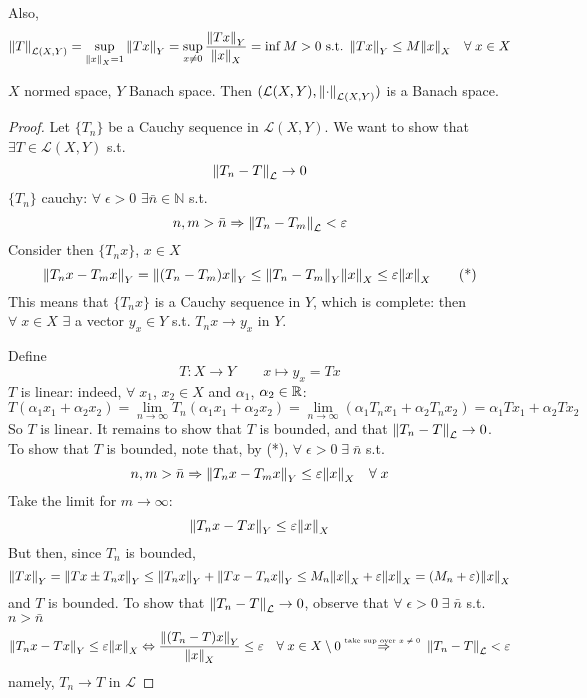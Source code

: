 Also, 
\[
    \norm{T}_{\mathcal{L}(X, Y)} = \sup_{\norm{x}_X = 1} \norm{Tx}_Y = \sup_{x \neq 0} \frac{\norm{Tx}_Y}{\norm{x}_X} = \inf{M >0 \text{ s.t. } \norm{Tx}_Y \leq M \norm{x}_X \quad \forall \; x \in X}
\]

\begin{theorem}
    \(X\) normed space, \(Y\) Banach space. Then \((\mathcal{L}(X, Y), \norm{\cdot}_{\mathcal{L}(X, Y)})\) is a Banach space.
\end{theorem}
\begin{proof}
    Let \(\{T_n\}\) be a Cauchy sequence in \(\mathcal{L}(X, Y)\). We want to show that \(\exists T \in \mathcal{L}(X, Y) \) s.t.
    \[
        \norm{T_n - T}_\mathcal{L} \to 0
    \]
    \(\{T_n\}\) cauchy: \(\forall \; \epsilon >0 \) \(\exists \bar{n} \in \mathbb{N}\) s.t. 
    \[
        n, m > \bar{n} \Rightarrow \norm{T_n - T_m }_\mathcal{L} < \varepsilon
    \]
    Consider then \(\{ T_n x \}\), \(x \in X\)
    \[
        \norm{T_n x - T_m x }_Y = \norm{(T_n - T_m)x}_Y \leq \norm{T_n - T_m}_Y \norm{x}_X \leq \varepsilon \norm{x}_X \tag{*}
    \]
    This means that \(\{ T_n x \}\) is a Cauchy sequence in \(Y\), which is complete: then \(\forall \; x \in X\) \(\exists \) a vector \(y_x \in Y\) s.t. \(T_n x \to y_x\) in \(Y\).

    Define 
    \[
        T: X \to Y \qquad x \mapsto y_x = Tx
    \]
    \(T\) is linear: indeed, \(\forall \; x_1\), \(x_2 \in X\) and \(\alpha_1\), \(\alpha_2 \in \mathbb{R}\):
    \[
        T(\alpha_1 x_1 + \alpha_2 x_2) = \lim_{n \to \infty} T_n (\alpha_1 x_1 + \alpha_2 x_2) = \lim_{n \to \infty} (\alpha_1 T_n x_1 + \alpha_2 T_n x_2) = \alpha_1 Tx_1 + \alpha_2 Tx_2
    \]
    So \(T \) is linear. It remains to show that \(T\) is bounded, and that \(\norm{T_n - T}_{\mathcal{L}} \to 0\).
    To show that \(T\) is bounded, note that, by (*), \(\forall \; \epsilon >0 \; \exists \; \bar{n}\) s.t.
    \[
        n, m > \bar{n} \Rightarrow \norm{T_n x - T_m x}_Y \leq \varepsilon \norm{x}_X \quad \forall \; x 
    \]
    Take the limit for \(m \to \infty\): 
    \[
        \norm{T_n x - Tx}_Y \leq \varepsilon \norm{x}_X
    \]
    But then, since \(T_n\) is bounded, 
    \[
        \norm{Tx}_Y = \norm{Tx \pm T_n x}_Y \leq \norm{T_n x}_Y + \norm{Tx - T_n x}_Y \leq M_n \norm{x}_X + \varepsilon \norm{x}_X = (M_n + \varepsilon) \norm{x}_X
    \]
    and \(T\) is bounded. To show that \(\norm{T_n - T}_\mathcal{L} \to 0\), observe that \(\forall \; \epsilon >0 \; \exists \; \bar{n} \) s.t. \(n > \bar{n}\)
    \[
        \norm{T_n x - Tx}_Y \leq \varepsilon \norm{x}_X 
        \Leftrightarrow \frac{\norm{(T_n - T)x}_Y}{\norm{x}_X} \leq \varepsilon \quad \forall \; x \in X \setminus {0}
        \overset{\text{\tiny{take sup over \(x \neq 0\)} }}{\Rightarrow} \norm{T_n - T}_\mathcal{L} < \varepsilon
    \]
    namely, \(T_n \to T\) in \(\mathcal{L}\)
\end{proof}